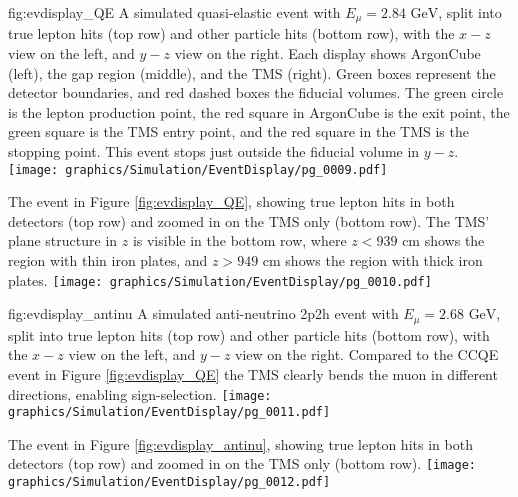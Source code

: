 \begin{dunefigure}[]{fig:evdisplay_QE}
{A simulated quasi-elastic event with $E_\mu=2.84\text{ GeV}$, split into true lepton hits (top row) and other particle hits (bottom row), with the $x-z$ view on the left, and $y-z$ view on the right. Each display shows ArgonCube (left), the gap region (middle), and the TMS (right). Green boxes represent the detector boundaries, and red dashed boxes the fiducial volumes. The green circle is the lepton production point, the red square in ArgonCube is the exit point, the green square is the TMS entry point, and the red square in the TMS is the stopping point. This event stops just outside the fiducial volume in $y-z$.}
\texttt{[image: graphics/Simulation/EventDisplay/pg\_0009.pdf]}
\end{dunefigure}

\begin{dunefigure}[]{}
{The event in Figure \ref{fig:evdisplay_QE}, showing true lepton hits in both detectors (top row) and zoomed in on the TMS only (bottom row). The TMS' plane structure in $z$ is visible in the bottom row, where $z<939\text{ cm}$ shows the region with thin iron plates, and $z>949\text{ cm}$ shows the region with thick iron plates.}
\texttt{[image: graphics/Simulation/EventDisplay/pg\_0010.pdf]}
\end{dunefigure}

\begin{dunefigure}{fig:evdisplay_antinu}
{A simulated anti-neutrino 2p2h event with $E_\mu=2.68\text{ GeV}$, split into true lepton hits (top row) and other particle hits (bottom row), with the $x-z$ view on the left, and $y-z$ view on the right. Compared to the CCQE event in Figure \ref{fig:evdisplay_QE} the TMS clearly bends the muon in different directions, enabling sign-selection.}
\texttt{[image: graphics/Simulation/EventDisplay/pg\_0011.pdf]}
\end{dunefigure}

\begin{dunefigure}[]{}
{The event in Figure \ref{fig:evdisplay_antinu}, showing true lepton hits in both detectors (top row) and zoomed in on the TMS only (bottom row).}
\texttt{[image: graphics/Simulation/EventDisplay/pg\_0012.pdf]}
\end{dunefigure}

